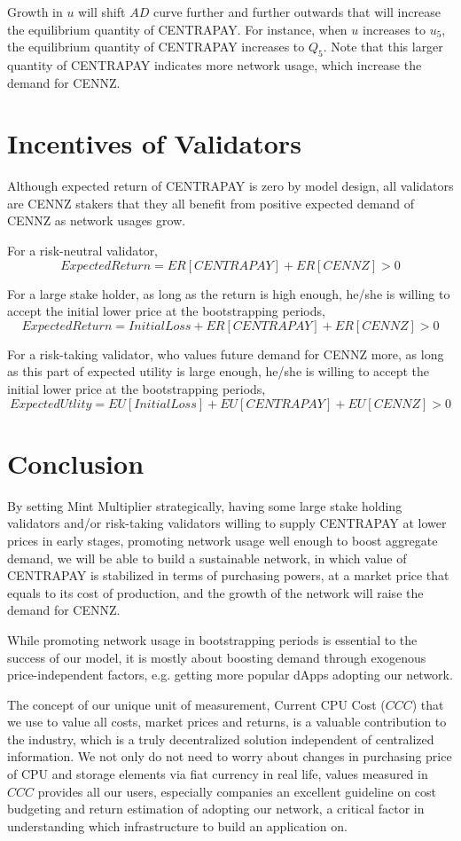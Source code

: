 \documentclass{article}
\begin{document}
Growth in $u$ will shift $AD$ curve further and further outwards that will increase the equilibrium quantity of CENTRAPAY. For instance, when $u$ increases to $u_5$, the equilibrium quantity of CENTRAPAY increases to $Q_5$. Note that this larger quantity of CENTRAPAY indicates more network usage, which increase the demand for CENNZ. 

\section{Incentives of Validators}
Although expected return of CENTRAPAY is zero by model design, all validators are CENNZ stakers that they all benefit from positive expected demand of CENNZ as network usages grow.   \par

For a risk-neutral validator, 
$$Expected Return=ER[CENTRAPAY]+ER[CENNZ]>0$$

For a large stake holder, as long as the return is high enough, he/she is willing to accept the initial lower price at the bootstrapping periods,
$$Expected Return=Initial Loss+ER[CENTRAPAY]+ER[CENNZ]>0$$

For a risk-taking validator, who values future demand for CENNZ more, as long as this part of expected utility is large enough, he/she is willing to accept the initial lower price at the bootstrapping periods,
$$Expected Utlity=EU[Initial Loss]+EU[CENTRAPAY]+EU[CENNZ]>0$$

\section{Conclusion}
By setting Mint Multiplier strategically, having some large stake holding validators and/or risk-taking validators willing to supply CENTRAPAY at lower prices in early stages, promoting network usage well enough to boost aggregate demand, we will be able to build a sustainable network, in which value of CENTRAPAY is stabilized in terms of purchasing powers, at a market price that equals to its cost of production, and the growth of the network will raise the demand for CENNZ.\par

While promoting network usage in bootstrapping periods is essential to the success of our model, it is mostly about boosting demand through exogenous price-independent factors, e.g. getting more popular dApps adopting our network. \par

The concept of our unique unit of measurement, Current CPU Cost ($CCC$) that we use to value all costs, market prices and returns, is a valuable contribution to the industry, which is a truly decentralized solution independent of centralized information. We not only do not need to worry about changes in purchasing price of CPU and storage elements via fiat currency in real life, values measured in $CCC$ provides all our users, especially companies an excellent guideline on cost budgeting and return estimation of adopting our network, a critical factor in understanding which infrastructure to build an application on. 
\end{document}
